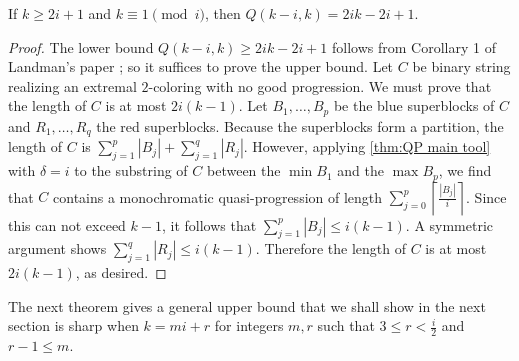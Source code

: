 \begin{theorem} If $k \geq 2i + 1$ and $k \equiv 1 \pmod{i}$, then $Q(k-i,k) = 2ik-2i+1$.
\end{theorem}
\begin{proof} 
The lower bound $Q(k-i,k) \geq 2ik-2i+1$ follows from Corollary 1 of Landman's paper \cite{L}; so it suffices to prove the upper bound. Let $C$ be binary string realizing an extremal $2$-coloring with no good progression. We must prove that the length of $C$ is at most $2i(k-1)$. Let $B_1,\ldots,B_p$ be the blue superblocks of $C$ and $R_1,\ldots,R_q$ the red superblocks. Because the superblocks form a partition, the length of $C$ is $\sum_{j=1}^p |B_j| +\sum_{j=1}^q |R_j|$. However, applying \autoref{thm:QP main tool} with $\delta = i$ to the substring of $C$ between the $\min B_1$ and the $\max B_p$, we find that $C$ contains a monochromatic quasi-progression of length $\sum_{j=0}^p \left\lceil \frac{|B_j|}{i} \right\rceil$. Since this can not exceed $k-1$, it follows that $\sum_{j=1}^p |B_j| \leq i (k-1)$. A symmetric argument shows $\sum_{j=1}^q |R_j| \leq i (k-1)$. Therefore the length of $C$ is at most $2i(k-1)$, as desired.
\end{proof}

The next theorem gives a general upper bound that we shall show in the next section is sharp when $k=mi+r$ for integers $m,r$ such that $3 \leq r < \frac{i}{2}$ and $r-1 \leq m$.


